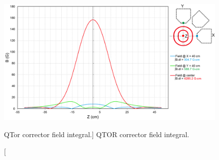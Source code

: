 


\begin{figure}[!h]
	\begin{center}
		\includegraphics[width=15.0cm]{figures/qtor_corrector_field_integral}
		\caption
		[QTor corrector field integral.]
		{QTOR corrector field integral.}
		\label{fig:qtor_corrector_field_integral}
	\end{center}
\end{figure}

